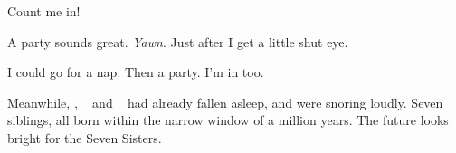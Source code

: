 \documentclass[main.tex]{subfiles}
\begin{document}
\par \Merope  Count me in!  

\par \Electra A party sounds great. \textit{Yawn}. Just after I get a little shut eye.

\par \Sterope I could go for a nap. Then a party.  I'm in too.

\par \nar Meanwhile, \rmtaygete, \rmalcyone~ and \rmcelaeno~ had already fallen asleep, and were snoring loudly.  Seven siblings, all born within the narrow window of a million years.  The future looks bright for the Seven Sisters.
\end{document}

